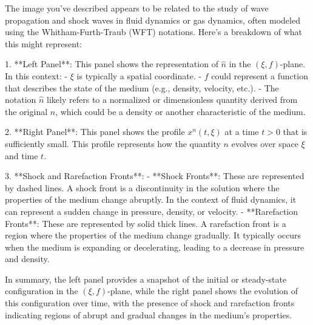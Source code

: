 The image you've described appears to be related to the study of wave propagation and shock waves in fluid dynamics or gas dynamics, often modeled using the Whitham-Furth-Traub (WFT) notations. Here's a breakdown of what this might represent:

1. **Left Panel**: This panel shows the representation of \( \hat{n} \) in the \((\xi, f)\)-plane. In this context:
   - \(\xi\) is typically a spatial coordinate.
   - \(f\) could represent a function that describes the state of the medium (e.g., density, velocity, etc.).
   - The notation \(\hat{n}\) likely refers to a normalized or dimensionless quantity derived from the original \(n\), which could be a density or another characteristic of the medium.

2. **Right Panel**: This panel shows the profile \(x^n(t, \xi)\) at a time \(t > 0\) that is sufficiently small. This profile represents how the quantity \(n\) evolves over space \(\xi\) and time \(t\).

3. **Shock and Rarefaction Fronts**:
   - **Shock Fronts**: These are represented by dashed lines. A shock front is a discontinuity in the solution where the properties of the medium change abruptly. In the context of fluid dynamics, it can represent a sudden change in pressure, density, or velocity.
   - **Rarefaction Fronts**: These are represented by solid thick lines. A rarefaction front is a region where the properties of the medium change gradually. It typically occurs when the medium is expanding or decelerating, leading to a decrease in pressure and density.

In summary, the left panel provides a snapshot of the initial or steady-state configuration in the \((\xi, f)\)-plane, while the right panel shows the evolution of this configuration over time, with the presence of shock and rarefaction fronts indicating regions of abrupt and gradual changes in the medium's properties.